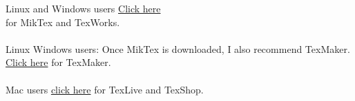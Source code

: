 \documentclass{article}
\begin{document}
Linux and Windows users  \href{https://miktex.org/download}{Click here}\\  for MikTex and TexWorks.\\ \\

Linux Windows users: Once MikTex is downloaded, I also recommend TexMaker.  \href{http://www.xm1math.net/texmaker/download.html}{Click here} for TexMaker.\\ \\


Mac users \href{http://pages.uoregon.edu/koch/texshop/obtaining.html}{click here} for TexLive and TexShop.\\ \\
\end{document}
